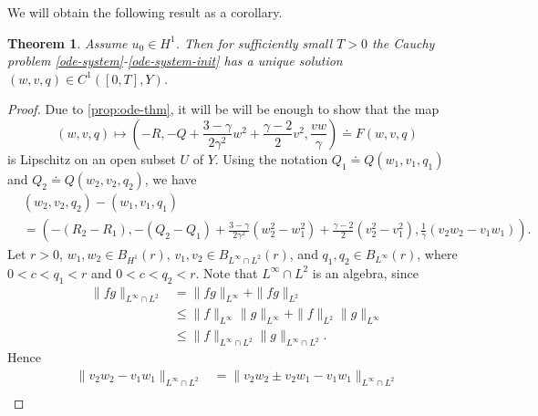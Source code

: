 \documentclass[12pt,reqno]{amsart}
\numberwithin{equation}{section}  %
\numberwithin{figure}{section}
\newtheorem{theorem}{Theorem}[section]
\begin{document}
We will obtain the following result as a corollary. 
%
%
%
%
%
%
%
%
\begin{theorem}
  Assume $u_{0} \in H^{1}$. Then for sufficiently small $T > 0$
the Cauchy problem \eqref{ode-system}-\eqref{ode-system-init} has a unique
solution $(w, v, q) \in C^{1}([0, T], Y)$.
\label{thm:ode-sys-sol}
\end{theorem}
%
%
\begin{proof}
  Due to \eqref{prop:ode-thm}, it will
  be will be enough to show that the map $$(w, v, q) \mapsto
\left ( -R, -Q + \frac{3 - \gamma}{2 \gamma^{2}}w^{2} + \frac{\gamma
-2}{2}v^{2}, \frac{vw}{\gamma} \right ) \doteq F(w, v, q)$$ is Lipschitz on
an open subset $U$ of $Y$. 
%
Using the notation $Q_{1} \doteq Q(w_{1}, v_{1}, q_{1})$ and $Q_{2} \doteq
Q(w_{2}, v_{2}, q_{2})$, we have
%
%
\begin{equation}
  \label{lip-diff}
\begin{split}
  & (w_{2}, v_{2}, q_{2}) - (w_{1}, v_{1}, q_{1})
  \\
  & = \left( -(R_{2} - R_{1}),
  -(Q_{2} - Q_{1}) + \frac{3 - \gamma}{2 \gamma^{2}}(w_{2}^{2} -
  w_{1}^{2}) + \frac{\gamma -2}{2} (v_{2}^{2} - v_{1}^{2}),
  \frac{1}{\gamma}(v_{2} w_{2} - v_{1} w_{1}) \right).
\end{split}
\end{equation}
%
Let $r>0$, $w_{1}, w_{2} \in B_{H^{1}}(r)$, $v_{1}, v_{2} \in B_{L^{\infty} \cap L^{2}}(r)$, and
$q_{1}, q_{2} \in B_{L^{\infty}}(r)$, where $0 < c < q_{1} < r$ and $0 < c <
q_{2} <r$.
Note that $L^{\infty} \cap L^{2}$ is an algebra, since
%
%
\begin{equation*}
\begin{split}
  \| fg \|_{L^{\infty} \cap L^{2}} & = \| fg \|_{L^{\infty}} + \| fg \|_{L^{2}}
  \\
  & \le \| f \|_{L^{\infty}} \| g \|_{L^{\infty}} + \| f \|_{L^{2}}\| g \|_{L^{\infty}}
  \\
  & \le \| f \|_{L^{\infty} \cap L^{2}} \| g \|_{L^{\infty} \cap L^{2}}.
\end{split}
\end{equation*}
%
%
Hence
%
%
%
\begin{equation}
  \label{1aa}
\begin{split}
  \| v_{2}w_{2} - v_{1}w_{1} \|_{L^{\infty} \cap L^{2}}
  & = \| v_{2}w_{2} \pm v_{2}w_{1} - v_{1}w_{1} \|_{L^{\infty} \cap L^{2}}
  \\

\end{split}
\end{equation}
\end{proof}
\end{document}
